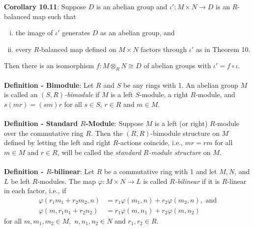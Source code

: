 \documentclass{article}
\begin{document}
\textbf{Corollary 10.11}: Suppose $D$ is an abelian group and $\iota': M \times N \rightarrow D$ is an $R$-balanced map such that \begin{enumerate}[(i)]
    \item the image of $\iota'$ generates $D$ as an abelian group, and
    \item every $R$-balanced map defined on $M \times N$ factors through $\iota'$ as in Theorem 10.
\end{enumerate} Then there is an isomorphism $f: M \otimes_R N \cong D$ of abelian groups with $\iota' = f \circ \iota.$ \\ \\
\textbf{Definition - Bimodule}: Let $R$ and $S$ be any rings with 1. An abelian group $M$ is called an \textit{$(S, R)$-bimodule} if $M$ is a left $S$-module, a right $R$-module, and $s(mr) = (sm)r$ for all $s \in S$, $r \in R$ and $m \in M$. \\ \\
\textbf{Definition - Standard $R$-Module}: Suppose $M$ is a left (or right) $R$-module over the commutative ring $R$. Then the $(R, R)$-bimodule structure on $M$ defined by letting the left and right $R$-actions coincide, i.e., $mr = rm$ for all $m \in M$ and $r \in R$, will be called the \textit{standard $R$-module structure} on $M$. \\ \\
\textbf{Definition - $R$-bilinear}: Let $R$ be a commutative ring with 1 and let $M, N$, and $L$ be left $R$-modules. The map $\varphi: M \times N \rightarrow L$ is called \textit{$R$-bilinear} if it is $R$-linear in each factor, i.e., if \begin{align*}
    \varphi(r_1 m_1 + r_2 m_2, n) &= r_1 \varphi(m_1, n) + r_2 \varphi(m_2, n), \text{ and} \\
    \varphi(m, r_1 n_1 + r_2 n_2) &= r_1 \varphi(m, n_1) + r_2 \varphi(m, n_2)
\end{align*} for all $m, m_1, m_2 \in M,$ $n, n_1, n_2 \in N$ and $r_1, r_2 \in R.$ \\ \\
\end{document}
